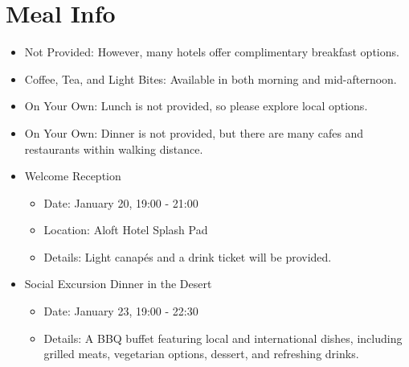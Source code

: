 \chapter{Meal Info}
\vspace*{-0.2cm}
\begin{itemize}[noitemsep]
    \item Not Provided: However, many hotels offer complimentary breakfast options.
\end{itemize}

\vspace*{-0.2cm}
\begin{itemize}[noitemsep]
    \item Coffee, Tea, and Light Bites: Available in both morning and mid-afternoon.
\end{itemize}

\vspace*{-0.2cm}
\begin{itemize}[noitemsep]
    \item On Your Own: Lunch is not provided, so please explore local options.
\end{itemize}

\vspace*{-0.2cm}
\begin{itemize}[noitemsep]
    \item On Your Own: Dinner is not provided, but there are many cafes and restaurants within walking distance.
\end{itemize}

\noindent\hrulefill
{}
\vspace*{-0.2cm}
\begin{itemize}[noitemsep]
\item Welcome Reception
\begin{itemize}[noitemsep]
\item Date: January 20, 19:00 - 21:00
\item Location: Aloft Hotel Splash Pad
\item Details: Light canapés and a drink ticket will be provided.
\end{itemize}

\item Social Excursion Dinner in the Desert
\begin{itemize}[noitemsep]
\item Date: January 23, 19:00 - 22:30
\item Details: A BBQ buffet featuring local and international dishes, including grilled meats, vegetarian options, dessert, and refreshing drinks.
\end{itemize}
\end{itemize}
